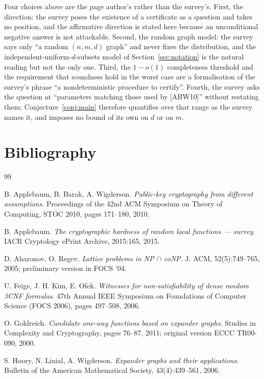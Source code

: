 \documentclass{conjura-conjecture}
\begin{document}
\begin{remark}\label{rem:readings}
Four choices above are the page author's rather than the survey's.
First, the direction: the survey poses the existence of a certificate
as a question and takes no position, and the affirmative direction is
stated here because an unconditional negative answer is not attackable.
Second, the random graph model: the survey says only ``a random
$(n,m,d)$ graph'' and never fixes the distribution, and the
independent-uniform-$d$-subsets model of Section~\ref{sec:notation} is
the natural reading but not the only one. Third, the $1-o(1)$
completeness threshold and the requirement that soundness hold in the
worst case are a formalisation of the survey's phrase ``a
nondeterministic procedure to certify''. Fourth, the survey asks the
question at ``parameters matching those used by [ABW10]'' without
restating them; Conjecture~\ref{conj:main} therefore quantifies over
that range as the survey names it, and imposes no bound of its own on
$d$ or on $m$.
\end{remark}

\section{Bibliography}

\begin{conjurabibliography}{99}

B. Applebaum, B. Barak, A. Wigderson.
\emph{Public-key cryptography from different assumptions}.
Proceedings of the 42nd ACM Symposium on Theory of Computing, STOC
2010, pages 171--180, 2010.

B. Applebaum.
\emph{The cryptographic hardness of random local functions --- survey}.
IACR Cryptology ePrint Archive, 2015:165, 2015.

D. Aharonov, O. Regev.
\emph{Lattice problems in NP $\cap$ coNP}.
J. ACM, 52(5):749--765, 2005; preliminary version in FOCS '04.

U. Feige, J. H. Kim, E. Ofek.
\emph{Witnesses for non-satisfiability of dense random 3CNF formulas}.
47th Annual IEEE Symposium on Foundations of Computer Science (FOCS
2006), pages 497--508, 2006.

O. Goldreich.
\emph{Candidate one-way functions based on expander graphs}.
Studies in Complexity and Cryptography, pages 76--87, 2011; original
version ECCC TR00-090, 2000.

S. Hoory, N. Linial, A. Wigderson.
\emph{Expander graphs and their applications}.
Bulletin of the American Mathematical Society, 43(4):439--561, 2006.

\end{conjurabibliography}
\end{document}
